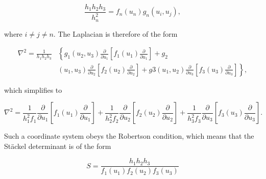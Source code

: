 \documentclass[a4paper]{article}
\begin{document}
\begin{equation} \label{eq3}
\frac{h_1h_2h_3}{h_n^2} = f_n(u_n)g_n(u_i, u_j), 
\end{equation} \vspace{0.2cm}

\noindent where $i\neq j\neq n$. The {\color{Emerald}Laplacian} is therefore {\color{Emerald}of the form} 

\begin{equation} \label{eq4}
\begin{split}
\nabla^2 = \frac{1}{h_1h_2h_3} & \left \{g_1(u_2, u_3) \frac{\partial}{\partial u_1} \left [f_1(u_1) \frac{\partial}{\partial u_1} \right] + g_2 \right.\\
& \left. (u_1, u_3) \frac{\partial}{\partial u_2} \left [f_2(u_2) \frac{\partial}{\partial u_2} \right] + g3 (u_1, u_2) \frac{\partial}{\partial u_3} \left [f_3(u_3) \frac{\partial}{\partial u_3} \right] \right\},
\end{split}
\end{equation} \vspace{0.2cm}

\noindent which simplifies to

\begin{equation} \label{eq5}
\nabla^2 = \frac{1}{h_1^2f_1} \frac{\partial}{\partial u_1} \left [f_1(u_1) \frac{\partial}{\partial u_1} \right] + 
\frac{1}{h_2^2f_2} \frac{\partial}{\partial u_2} \left [f_2(u_2) \frac{\partial}{\partial u_2} \right] + 
\frac{1}{h_3^2f_3} \frac{\partial}{\partial u_3} \left [f_3(u_3) \frac{\partial}{\partial u_3} \right].
\end{equation} \vspace{0.3cm}

\noindent Such a coordinate system obeys the {\color{Emerald}Robertson condition}, which means that the {\color{Emerald}Stäckel determinant} is {\color{Emerald}of the form}

\begin{equation} \label{eq6}
S = \frac{h_1 h_2 h_3}{f_1(u_1)f_2(u_2)f_3(u_3)}
\end{equation} \vspace{1cm}


\noindent {}


\noindent{\color{ForestGreen}\rule{7cm}{0.1mm}}
\end{document}
